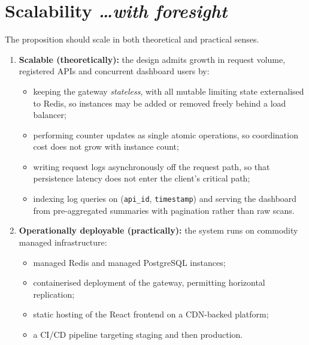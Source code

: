 \documentclass[11pt,a4paper]{article}
\newcommand{\BvrHint}[1]{%
  {\normalfont\normalsize\itshape\hfill #1}}
\begin{document}
\section{Scalability %
\BvrHint{\ldots with foresight}}
The proposition should scale in both theoretical and practical senses.

\begin{enumerate}[leftmargin=0.7cm]
    \item \textbf{Scalable (theoretically):} the design admits growth in
      request volume, registered APIs and concurrent dashboard users by:
    \begin{itemize}[leftmargin=0.7cm]
        \item keeping the gateway \emph{stateless}, with all mutable limiting
          state externalised to Redis, so instances may be added or removed
          freely behind a load balancer;
        \item performing counter updates as single atomic operations, so
          coordination cost does not grow with instance count;
        \item writing request logs asynchronously off the request path, so
          that persistence latency does not enter the client's critical path;
        \item indexing log queries on (\texttt{api\_id}, \texttt{timestamp})
          and serving the dashboard from pre-aggregated summaries with
          pagination rather than raw scans.
    \end{itemize}

    \item \textbf{Operationally deployable (practically):} the system runs on
      commodity managed infrastructure:
    \begin{itemize}[leftmargin=0.7cm]
        \item managed Redis and managed PostgreSQL instances;
        \item containerised deployment of the gateway, permitting horizontal
          replication;
        \item static hosting of the React frontend on a CDN-backed platform;
        \item a CI/CD pipeline targeting staging and then production.
    \end{itemize}
\end{enumerate}
\end{document}
